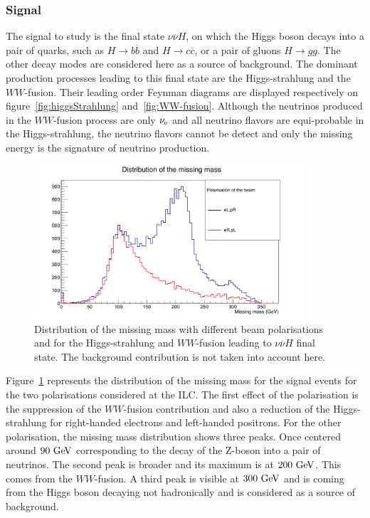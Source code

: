   \subsubsection{Signal}

    The signal to study is the final state $\nu\overline{\nu}H$, on which the Higgs boson decays into a pair of quarks, such as $H \rightarrow b\overline{b}$ and $H \rightarrow c\overline{c}$, or a pair of gluons $H \rightarrow gg$. 
    The other decay modes are considered here as a source of background. 
    The dominant production processes leading to this final state are the Higgs-strahlung and the $WW$-fusion.
    Their leading order Feynman diagrams are displayed respectively on figure~\ref{fig:higgsStrahlung} and~\ref{fig:WW-fusion}.
    Although the neutrinos produced in the $WW$-fusion process are only $\nu_{\rm{e}}$ and all neutrino flavors are equi-probable in the Higgs-strahlung, the neutrino flavors cannot be detect and only the missing energy is the signature of neutrino production.

    \begin{figure}[!h]
      \centering
      \includegraphics[width = 0.9\textwidth]{Pictures/Higgs/mMiss.png}
      \caption{Distribution of the missing mass with different beam polarisations and for the Higgs-strahlung and $WW$-fusion leading to $\nu\overline{\nu}H$ final state.
      The background contribution is not taken into account here.}
      \label{fig:mMiss}
    \end{figure}

    Figure~\ref{fig:mMiss} represents the distribution of the missing mass for the signal events for the two polarisations considered at the \gls{ILC}.
    The first effect of the polarisation is the suppression of the $WW$-fusion contribution and also a reduction of the Higgs-strahlung for right-handed electrons and left-handed positrons.
    For the other polarisation, the missing mass distribution shows three peaks. 
    Once centered around $90~\rm{GeV}$ corresponding to the decay of the Z-boson into a pair of neutrinos.
    The second peak is broader and its maximum is at $200~\rm{GeV}$.
    This comes from the $WW$-fusion.
    A third peak is visible at $300~\rm{GeV}$ and is coming from the Higgs boson decaying not hadronically and is considered as a source of background.    

